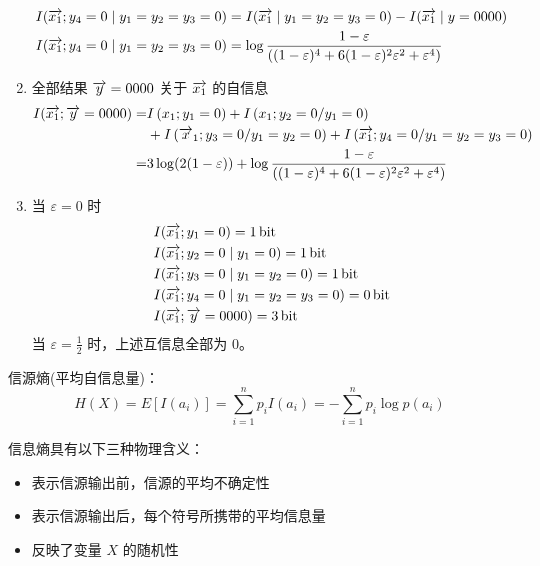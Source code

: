 \begin{remark}
\begin{solution}
\begin{enumerate}
\begin{align*}
                &I(\overrightarrow{x_1} ; y_4 = 0 \mid y_1 = y_2 = y_3 = 0) = I(\overrightarrow{x_1} \mid y_1 = y_2 = y_3 = 0) - I(\overrightarrow{x_1} \mid y = 0000)\\
                &I(\overrightarrow{x_1} ; y_4 = 0 \mid y_1 = y_2 = y_3 = 0) = \log\frac{1 - \varepsilon}{((1 - \varepsilon)^4 + 6(1 - \varepsilon)^2\varepsilon^2 + \varepsilon^4)}
            \end{align*}
            \item 全部结果 $\overrightarrow{y} = 0000$ 关于 $\overrightarrow{x_1}$ 的自信息
            \begin{align*}
                I(\overrightarrow{x_1};\overrightarrow{y} = 0000) =& I\left(x_{1} ; y_{1}=0\right)+I\left(x_{1} ; y_{2}=0 / y_{1}=0\right) \\
                &+I\left(\overrightarrow{x}_{1} ; y_{3}=0 / y_{1}=y_{2}=0\right)+I\left(\overrightarrow{x_{1}} ; y_{4}=0 / y_{1}=y_{2}=y_{3}=0\right)\\
                =& 3\log(2(1 - \varepsilon)) + \log\frac{1 - \varepsilon}{((1 - \varepsilon)^4 + 6(1 - \varepsilon)^2\varepsilon^2 + \varepsilon^4)}
            \end{align*}
            \item 当 $\varepsilon = 0$ 时
            \begin{align*}
                &I(\overrightarrow{x_1}; y_1 = 0) = \SI{1}{\mathrm{bit}}\\
                &I(\overrightarrow{x_1}; y_2 = 0 \mid y_1 = 0) = \SI{1}{\mathrm{bit}}\\
                &I(\overrightarrow{x_1}; y_3 = 0 \mid y_1 = y_2 = 0) = \SI{1}{\mathrm{bit}}\\
                &I(\overrightarrow{x_1} ; y_4 = 0 \mid y_1 = y_2 = y_3 = 0) = \SI{0}{\mathrm{bit}}\\
                &I(\overrightarrow{x_1} ; \overrightarrow{y} = 0000) = \SI{3}{\mathrm{bit}}
            \end{align*}
            当 $\varepsilon = \frac{1}{2}$ 时，上述互信息全部为 0。
        \end{enumerate}
    \end{solution}
\end{remark}

\begin{remark}
    信源熵(平均自信息量)：\[H(X)=E[I(a_{i})]=\sum_{i=1}^{n} p_{i} I(a_{i})=-\sum_{i=1}^{n} p_{i} \log p(a_{i})\]

    信息熵具有以下三种物理含义：
    \begin{itemize}
        \item 表示信源输出前，信源的平均不确定性
        \item 表示信源输出后，每个符号所携带的平均信息量
        \item 反映了变量 $X$ 的随机性
    \end{itemize}
\end{remark}

